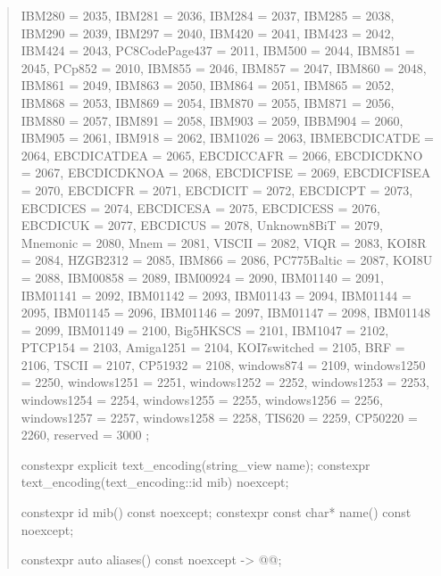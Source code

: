 \documentclass{wg21}
\begin{document}
\begin{quote}
\begin{addedblock}
\begin{codeblock}
{{{        IBM280 = 2035,
        IBM281 = 2036,
        IBM284 = 2037,
        IBM285 = 2038,
        IBM290 = 2039,
        IBM297 = 2040,
        IBM420 = 2041,
        IBM423 = 2042,
        IBM424 = 2043,
        PC8CodePage437 = 2011,
        IBM500 = 2044,
        IBM851 = 2045,
        PCp852 = 2010,
        IBM855 = 2046,
        IBM857 = 2047,
        IBM860 = 2048,
        IBM861 = 2049,
        IBM863 = 2050,
        IBM864 = 2051,
        IBM865 = 2052,
        IBM868 = 2053,
        IBM869 = 2054,
        IBM870 = 2055,
        IBM871 = 2056,
        IBM880 = 2057,
        IBM891 = 2058,
        IBM903 = 2059,
        IBBM904 = 2060,
        IBM905 = 2061,
        IBM918 = 2062,
        IBM1026 = 2063,
        IBMEBCDICATDE = 2064,
        EBCDICATDEA = 2065,
        EBCDICCAFR = 2066,
        EBCDICDKNO = 2067,
        EBCDICDKNOA = 2068,
        EBCDICFISE = 2069,
        EBCDICFISEA = 2070,
        EBCDICFR = 2071,
        EBCDICIT = 2072,
        EBCDICPT = 2073,
        EBCDICES = 2074,
        EBCDICESA = 2075,
        EBCDICESS = 2076,
        EBCDICUK = 2077,
        EBCDICUS = 2078,
        Unknown8BiT = 2079,
        Mnemonic = 2080,
        Mnem = 2081,
        VISCII = 2082,
        VIQR = 2083,
        KOI8R = 2084,
        HZGB2312 = 2085,
        IBM866 = 2086,
        PC775Baltic = 2087,
        KOI8U = 2088,
        IBM00858 = 2089,
        IBM00924 = 2090,
        IBM01140 = 2091,
        IBM01141 = 2092,
        IBM01142 = 2093,
        IBM01143 = 2094,
        IBM01144 = 2095,
        IBM01145 = 2096,
        IBM01146 = 2097,
        IBM01147 = 2098,
        IBM01148 = 2099,
        IBM01149 = 2100,
        Big5HKSCS = 2101,
        IBM1047 = 2102,
        PTCP154 = 2103,
        Amiga1251 = 2104,
        KOI7switched = 2105,
        BRF = 2106,
        TSCII = 2107,
        CP51932 = 2108,
        windows874 = 2109,
        windows1250 = 2250,
        windows1251 = 2251,
        windows1252 = 2252,
        windows1253 = 2253,
        windows1254 = 2254,
        windows1255 = 2255,
        windows1256 = 2256,
        windows1257 = 2257,
        windows1258 = 2258,
        TIS620 = 2259,
        CP50220 = 2260,
        reserved = 3000
    };

    constexpr explicit text_encoding(string_view name);
    constexpr text_encoding(text_encoding::id mib) noexcept;

    constexpr id mib() const noexcept;
    constexpr const char* name() const noexcept;

    constexpr auto aliases() const noexcept -> @{\seebelow}@;

}}
\end{codeblock}
\end{addedblock}
\end{quote}
\end{document}
